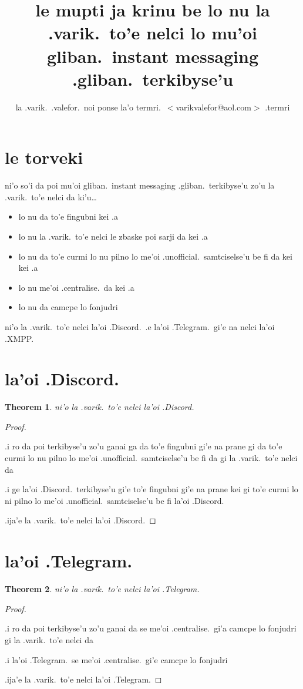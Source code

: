 \documentclass{article}
\title{le mupti ja krinu be lo nu la .varik.\ to'e nelci lo mu'oi gliban.\ instant messaging .gliban.\ terkibyse'u}
\author{la .varik.\ .valefor.\ noi ponse la'o termri.\ $<$varikvalefor@aol.com$>$ .termri}
\newtheorem{thm}{Theorem}
\begin{document}
\maketitle

\section{le torveki}
ni'o so'i da poi mu'oi gliban.\ instant messaging .gliban.\ terkibyse'u zo'u la .varik.\ to'e nelci da ki'u\ldots
\begin{itemize}
	\item lo nu da to'e fingubni kei .a
	\item lo nu la .varik.\ to'e nelci le zbaske poi sarji da kei .a
	\item lo nu da to'e curmi lo nu pilno lo me'oi .unofficial.\ samtciselse'u be fi da kei kei .a
	\item lo nu me'oi .centralise.\ da kei .a
	\item lo nu da camcpe lo fonjudri
\end{itemize}

ni'o la .varik.\ to'e nelci la'oi .Discord.\ .e la'oi .Telegram.\ gi'e na nelci la'oi .XMPP.
\section{la'oi .Discord.}
\begin{thm}
	ni'o la .varik.\ to'e nelci la'oi .Discord.
\end{thm}
\begin{proof}
	${}$

	.i ro da poi terkibyse'u zo'u ganai ga da to'e fingubni gi'e na prane gi da to'e curmi lo nu pilno lo me'oi .unofficial.\ samtciselse'u be fi da gi la .varik.\ to'e nelci da

	.i ge la'oi .Discord.\ terkibyse'u gi'e to'e fingubni gi'e na prane kei gi to'e curmi lo ni pilno lo me'oi .unofficial.\ samtciselse'u be fi la'oi .Discord.

	.ija'e la .varik.\ to'e nelci la'oi .Discord.
\end{proof}

\section{la'oi .Telegram.}
\begin{thm}
	ni'o la .varik.\ to'e nelci la'oi .Telegram.
\end{thm}
\begin{proof}
	${}$

	.i ro da poi terkibyse'u zo'u ganai da se me'oi .centralise.\ gi'a camcpe lo fonjudri gi la .varik.\ to'e nelci da

	.i la'oi .Telegram.\ se me'oi .centralise.\ gi'e camcpe lo fonjudri

	.ija'e la .varik.\ to'e nelci la'oi .Telegram.
\end{proof}
\end{document}
